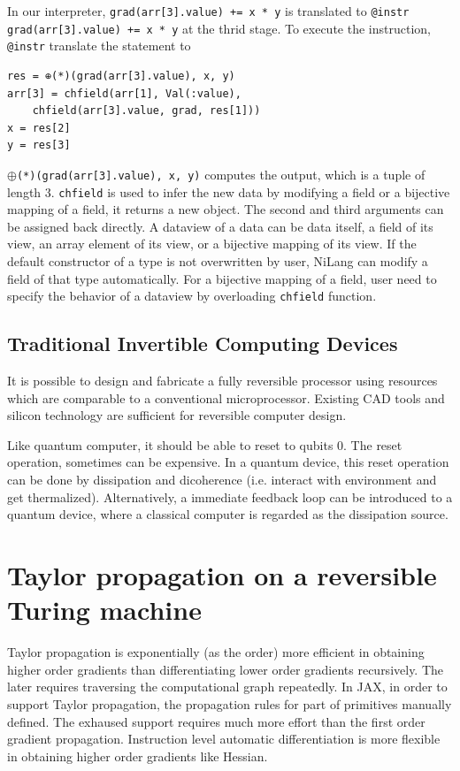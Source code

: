 \documentclass[aps,twocolumn,longbibliography,english,superscriptaddress,prr]{revtex4-1}
\newcommand{\<}{\langle}
\renewcommand{\>}{\rangle}
\theoremstyle{definition}\newtheorem{definition}{\textit{Definition}}
\begin{document}
In our interpreter, \texttt{grad(arr[3].value) += x * y} is translated to \texttt{@instr grad(arr[3].value) += x * y} at the thrid stage.
To execute the instruction, \texttt{@instr} translate the statement to
\begin{minipage}{.44\textwidth}
\begin{lstlisting}
res = ⊕(*)(grad(arr[3].value), x, y)
arr[3] = chfield(arr[1], Val(:value), 
    chfield(arr[3].value, grad, res[1]))
x = res[2]
y = res[3]
\end{lstlisting}
\end{minipage}
\texttt{$\oplus$(*)(grad(arr[3].value), x, y)} computes the output, which is a tuple of length $3$.
\texttt{chfield} is used to infer the new data by modifying a field or a bijective mapping of a field, it returns a new object.
The second and third arguments can be assigned back directly.
A dataview of a data can be data itself, a field of its view, an array element of its view, or a bijective mapping of its view.
If the default constructor of a type is not overwritten by user, NiLang can modify a field of that type automatically.
For a bijective mapping of a field, user need to specify the behavior of a dataview by overloading \texttt{chfield} function.

\subsection{Traditional Invertible Computing Devices}
It is possible to design and fabricate a fully reversible processor using resources which are comparable to a conventional microprocessor. Existing CAD tools and silicon technology are sufficient for reversible computer design.

Like quantum computer, it should be able to reset to qubits $0$. The reset operation, sometimes can be expensive. In a quantum device, this reset operation can be done by dissipation and dicoherence (i.e. interact with environment and get thermalized). Alternatively, a immediate feedback loop can be introduced to a quantum device, where a classical computer is regarded as the dissipation source.


\section{Taylor propagation on a reversible Turing machine}\label{sec:bp}
Taylor propagation is exponentially (as the order) more efficient in obtaining higher order gradients than differentiating lower order gradients recursively.
The later requires traversing the computational graph repeatedly.
In JAX, in order to support Taylor propagation, the propagation rules for part of primitives manually defined.
The exhaused support requires much more effort than the first order gradient propagation.
Instruction level automatic differentiation is more flexible in obtaining higher order gradients like Hessian.
\end{document}
